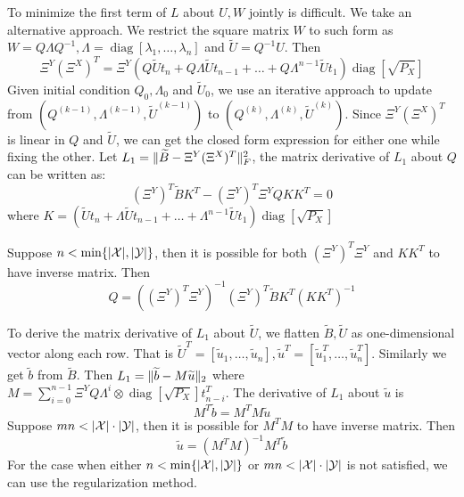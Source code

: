 \documentclass{article}
\DeclarePairedDelimiter\abs{\lvert}{\rvert}
\DeclarePairedDelimiter\norm{\lVert}{\rVert}
\DeclareMathOperator\diag{diag}
\begin{document}
To minimize the first term of $L$ about $U,W$ jointly  is difficult. We take an alternative approach. We restrict the square matrix $W$ to such form as $ W = Q \Lambda Q^{-1}, \Lambda =  \diag[\lambda_1,\dots, \lambda_n]$ and $ \widetilde{U} = Q^{-1}U$.
Then
$$
\Xi^Y (\Xi^{X})^T = \Xi^Y (Q\widetilde{U} t_n + Q \Lambda \widetilde{U} t_{n-1} + \dots + Q \Lambda^{n-1} \widetilde{U} t_1 )\diag[\sqrt{P_X}]
$$
Given initial condition $Q_0, \Lambda_0$ and $\widetilde{U}_0$, we use an iterative approach to update from 
$(Q^{(k-1)}, \Lambda^{(k-1)}, \widetilde{U}^{(k-1)})$ to $(Q^{(k)}, \Lambda^{(k)}, \widetilde{U}^{(k)})$.
Since $ \Xi^Y (\Xi^{X})^T$ is linear in $Q$ and $\widetilde{U}$, we can get the closed form expression for either one while fixing the other. Let $ L_1 = \norm{\widetilde{B} - \Xi^Y (\Xi^{X})^T}_F^2 $, the matrix derivative of $L_1$ about $Q$ can be written as:
\begin{equation}\label{eq:Q_iterative}
  (\Xi^Y)^T \widetilde{B} K^T - (\Xi^Y)^T\Xi^Y Q KK^T = 0
\end{equation}
where $ K = (\widetilde{U} t_n + \Lambda \widetilde{U} t_{n-1} + \dots + \Lambda^{n-1} \widetilde{U} t_1)
\diag [ \sqrt{P_X} ] $

Suppose $n<\min\{\abs{\mathcal{X}}, \abs{\mathcal{Y}}\}$, then it is possible for both $ (\Xi^Y)^T\Xi^Y$ and 
$KK^T$ to have inverse matrix. Then 
$$ Q = ((\Xi^Y)^T\Xi^Y)^{-1} (\Xi^Y)^T \widetilde{B} K^T (KK^T)^{-1} $$

To derive the matrix derivative of $L_1$ about $\widetilde{U}$, we flatten $\widetilde{B}, \widetilde{U}$ as one-dimensional vector along each row. That is $\widetilde{U}^T = [\widetilde{u}_1, \dots, \widetilde{u}_n], \widetilde{u}^T = [ \widetilde{u}_1^T, \dots, \widetilde{u}_n^T]$. Similarly we get $\widetilde{b}$ from $\widetilde{B}$. Then
$L_1 = \norm{\widetilde{b} - M \widetilde{u}}_2$ where $ M = \sum_{i=0}^{n-1} \Xi^Y Q \Lambda^i \otimes \diag[\sqrt{P_X}] t_{n-i}^T$. The derivative of $L_1$ about $\widetilde{u}$ is
\begin{equation}\label{eq:U_iterative}
M^T \widetilde{b} = M^T M \widetilde{u}
\end{equation}
Suppose $mn < \abs{\mathcal{X}}\cdot\abs{\mathcal{Y}}$, then it is possible for $M^T M$ to have inverse matrix. Then 
$$ \widetilde{u} = (M^TM)^{-1} M^T \widetilde{b} $$
For the case when either $n<\min\{\abs{\mathcal{X}}, \abs{\mathcal{Y}}\}$ or  $mn < \abs{\mathcal{X}}\cdot\abs{\mathcal{Y}}$ is not satisfied, we can use the regularization method.
\end{document}
